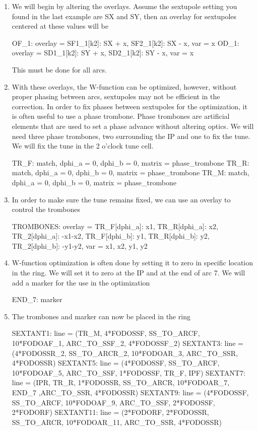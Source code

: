 \documentclass{hitec}     %
\begin{document}
{{{{\begin{enumerate}[leftmargin=*]
    \item We will begin by altering the overlays. Assume the sextupole setting you found in the last example are SX and SY, then an overlay for sextupoles centered at these values will be
    \begin{code}
    OF_1: overlay = {SF1_1[k2]:  SX + x, SF2_1[k2]:  SX - x}, var = {x}
    OD_1: overlay = {SD1_1[k2]:  SY + x, SD2_1[k2]:  SY - x}, var = {x}
    \end{code}
    This must be done for all arcs.
    \item With these overlays, the W-function can be optimized, however, without proper phasing between arcs, sextupoles may not be efficient in the correction. In order to fix phases between sextupoles for the optimization, it is often useful to use a phase trombone. Phase trombones are artificial elements that are used to set a phase advance without altering optics.
    We will need three phase trombones, two surrounding the IP and one to fix the tune. We will fix the tune in the 2 o'clock tune cell.
    \begin{code}
    TR_F: match, dphi_a = 0, dphi_b = 0, matrix = phase_trombone
    TR_R: match, dphi_a = 0, dphi_b = 0, matrix = phase_trombone
    TR_M: match, dphi_a = 0, dphi_b = 0, matrix = phase_trombone
    \end{code}
    \item In order to make sure the tune remains fixed, we can use an overlay to control the trombones
    \begin{code}
    TROMBONES: overlay = {TR_F[dphi_a]: x1, 
        TR_R[dphi_a]: x2, TR_2[dphi_a]: -x1-x2,
        TR_F[dphi_b]: y1, TR_R[dphi_b]: y2, TR_2[dphi_b]: -y1-y2},
           var = {x1, x2, y1, y2}

    \end{code}
    \item W-function optimization is often done by setting it to zero in specific location in the ring. We will set it to zero at the IP and at the end of arc 7. We will add a marker for the use in the optimization
    \begin{code}
    END_7: marker
    \end{code}
    \item The trombones and marker can now be placed in the ring
    \begin{code}
    SEXTANT1:  line = (TR_M, 4*FODOSSF, SS_TO_ARCF, 
        10*FODOAF_1, ARC_TO_SSF_2, 4*FODOSSF_2)
    SEXTANT3:  line = (4*FODOSSR_2, SS_TO_ARCR_2, 
        10*FODOAR_3, ARC_TO_SSR, 4*FODOSSR)
    SEXTANT5:  line = (4*FODOSSF, SS_TO_ARCF, 
        10*FODOAF_5, ARC_TO_SSF, 1*FODOSSF, TR_F, IPF)
    SEXTANT7:  line = (IPR, TR_R, 1*FODOSSR, SS_TO_ARCR,
        10*FODOAR_7, END_7 ,ARC_TO_SSR, 4*FODOSSR)
    SEXTANT9:  line = (4*FODOSSF, SS_TO_ARCF, 
        10*FODOAF_9, ARC_TO_SSF, 2*FODOSSF, 2*FODORF)
    SEXTANT11: line = (2*FODORF, 2*FODOSSR, SS_TO_ARCR, 
        10*FODOAR_11, ARC_TO_SSR, 4*FODOSSR)


\end{code}
\end{enumerate}}}}}
\end{document}
